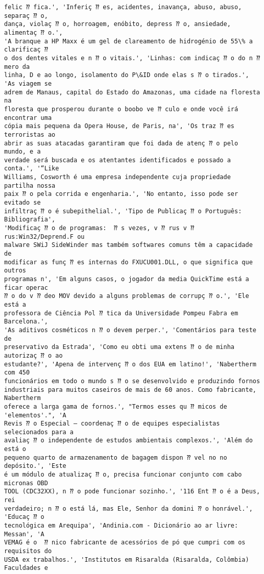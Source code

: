 \documentclass[10pt]{article}
\begin{document}
\begin{Verbatim}[commandchars=\\\{\}]
felic ⁇ fica.', 'Inferiç ⁇ es, acidentes, inavança, abuso, abuso, separaç ⁇ o,
dança, violaç ⁇ o, horroagem, enóbito, depress ⁇ o, ansiedade, alimentaç ⁇ o.',
'A branque a HP Maxx é um gel de clareamento de hidrogénio de 55\% a clarificaç ⁇
o dos dentes vitales e n ⁇ o vitais.', 'Linhas: com indicaç ⁇ o do n ⁇ mero da
linha, D e ao longo, isolamento do P\&ID onde elas s ⁇ o tirados.', 'As viagem se
adrem de Manaus, capital do Estado do Amazonas, uma cidade na floresta na
floresta que prosperou durante o boobo ve ⁇ culo e onde você irá encontrar uma
cópia mais pequena da Opera House, de Paris, na', 'Os traz ⁇ es terroristas ao
abrir as suas atacadas garantiram que foi dada de atenç ⁇ o pelo mundo, e a
verdade será buscada e os atentantes identificados e possado a conta.', '“Like
Williams, Cosworth é uma empresa independente cuja propriedade partilha nossa
paix ⁇ o pela corrida e engenharia.', 'No entanto, isso pode ser evitado se
infiltraç ⁇ o é subepithelial.', 'Tipo de Publicaç ⁇ o Português: Bibliografia',
'Modificaç ⁇ o de programas:  ⁇ s vezes, v ⁇ rus v ⁇ rus:Win32/Deprend.F ou
malware SWiJ SideWinder mas também softwares comuns têm a capacidade de
modificar as funç ⁇ es internas do FXUCU001.DLL, o que significa que outros
programas n', 'Em alguns casos, o jogador da media QuickTime está a ficar operac
⁇ o do v ⁇ deo MOV devido a alguns problemas de corrupç ⁇ o.', 'Ele está a
professora de Ciência Pol ⁇ tica da Universidade Pompeu Fabra em Barcelona.',
'As aditivos cosméticos n ⁇ o devem perper.', 'Comentários para teste de
preservativo da Estrada', 'Como eu obti uma extens ⁇ o de minha autorizaç ⁇ o ao
estudante?', 'Apena de intervenç ⁇ o dos EUA em latino!', 'Nabertherm com 450
funcionários em todo o mundo s ⁇ o se desenvolvido e produzindo fornos
industriais para muitos caseiros de mais de 60 anos. Como fabricante, Nabertherm
oferece a larga gama de fornos.', "Termos esses qu ⁇ micos de 'elementos'.", 'A
Revis ⁇ o Especial – coordenaç ⁇ o de equipes especialistas selecionados para a
avaliaç ⁇ o independente de estudos ambientais complexos.', 'Além do está o
pequeno quarto de armazenamento de bagagem dispon ⁇ vel no no depósito.', 'Este
é um módulo de atualizaç ⁇ o, precisa funcionar conjunto com cabo micronas OBD
TOOL (CDC32XX), n ⁇ o pode funcionar sozinho.', '116 Ent ⁇ o é a Deus, rei
verdadeiro; n ⁇ o está lá, mas Ele, Senhor da domini ⁇ o honrável.', 'Educaç ⁇ o
tecnológica em Arequipa', 'Andinia.com - Dicionário ao ar livre: Messan', 'A
VEMAG é o  ⁇ nico fabricante de acessórios de pó que cumpri com os requisitos do
USDA ex trabalhos.', 'Institutos em Risaralda (Risaralda, Colômbia) Faculdades e

\end{Verbatim}
\end{document}
